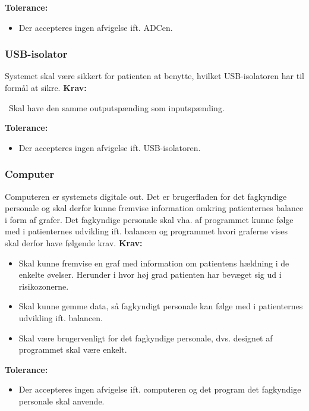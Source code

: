 \textbf{Tolerance:}
\begin{itemize}
\item Der accepteres ingen afvigelse ift. ADCen.
\end{itemize}

\subsubsection{USB-isolator}
Systemet skal være sikkert for patienten at benytte, hvilket USB-isolatoren har til formål at sikre.
\textbf{Krav:}
\begin{itemize}
\ Skal have den samme outputspænding som inputspænding. 
\end{itemize}

\textbf{Tolerance:}
\begin{itemize}
\item Der accepteres ingen afvigelse ift. USB-isolatoren. 
\end{itemize}

\subsubsection{Computer}
Computeren er systemets digitale out. Det er brugerfladen for det fagkyndige personale og skal derfor kunne fremvise information omkring patienternes balance i form af grafer. Det fagkyndige personale skal vha. af programmet kunne følge med i patienternes udvikling ift. balancen og programmet hvori graferne vises skal derfor have følgende krav.
\textbf{Krav:}
\begin{itemize}
\item Skal kunne fremvise en graf med information om patientens hældning i de enkelte øvelser. Herunder i hvor høj grad patienten har bevæget sig ud i risikozonerne. 
\item Skal kunne gemme data, så fagkyndigt personale kan følge med i patienternes udvikling ift. balancen.
\item Skal være brugervenligt for det fagkyndige personale, dvs. designet af programmet skal være enkelt. 
\end{itemize}

\textbf{Tolerance:}
\begin{itemize}
\item Der accepteres ingen afvigelse ift. computeren og det program det fagkyndige personale skal anvende. 
\end{itemize}


